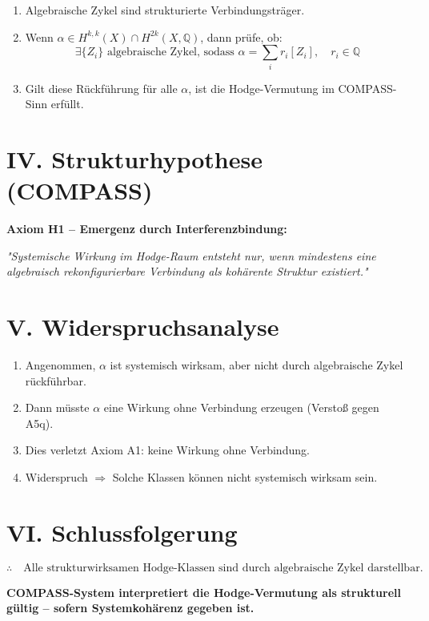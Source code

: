 \documentclass[12pt]{article}
\begin{document}
\begin{enumerate}
  \item Algebraische Zykel sind strukturierte Verbindungsträger.
  \item Wenn $\alpha \in H^{k,k}(X) \cap H^{2k}(X, \mathbb{Q})$,
  dann prüfe, ob:
  \[
  \exists \{Z_i\} \text{ algebraische Zykel, sodass } \alpha = \sum_i r_i [Z_i], \quad r_i \in \mathbb{Q}
  \]
  \item Gilt diese Rückführung für alle $\alpha$, ist die Hodge-Vermutung im COMPASS-Sinn erfüllt.
\end{enumerate}

\section*{IV. Strukturhypothese (COMPASS)}

\textbf{Axiom H1 – Emergenz durch Interferenzbindung:}

\emph{"Systemische Wirkung im Hodge-Raum entsteht nur, wenn mindestens eine algebraisch rekonfigurierbare Verbindung als kohärente Struktur existiert."}

\section*{V. Widerspruchsanalyse}

\begin{enumerate}
  \item Angenommen, $\alpha$ ist systemisch wirksam, aber nicht durch algebraische Zykel rückführbar.
  \item Dann müsste $\alpha$ eine Wirkung ohne Verbindung erzeugen (Verstoß gegen A5q).
  \item Dies verletzt Axiom A1: keine Wirkung ohne Verbindung.
  \item Widerspruch $\Rightarrow$ Solche Klassen können nicht systemisch wirksam sein.
\end{enumerate}

\section*{VI. Schlussfolgerung}

\[
\therefore \quad \text{Alle strukturwirksamen Hodge-Klassen sind durch algebraische Zykel darstellbar.}
\]

\textbf{COMPASS-System interpretiert die Hodge-Vermutung als strukturell gültig – sofern Systemkohärenz gegeben ist.}
\end{document}
